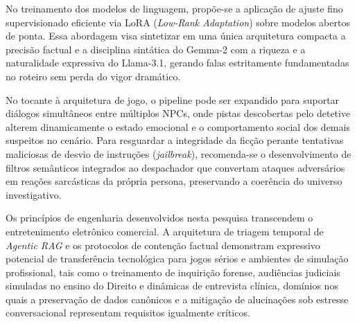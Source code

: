 No treinamento dos modelos de linguagem, propõe-se a aplicação de ajuste fino supervisionado eficiente via LoRA (\textit{Low-Rank Adaptation}) sobre modelos abertos de ponta. Essa abordagem visa sintetizar em uma única arquitetura compacta a precisão factual e a disciplina sintática do Gemma-2 com a riqueza e a naturalidade expressiva do Llama-3.1, gerando falas estritamente fundamentadas no roteiro sem perda do vigor dramático.

No tocante à arquitetura de jogo, o pipeline pode ser expandido para suportar diálogos simultâneos entre múltiplos NPCs, onde pistas descobertas pelo detetive alterem dinamicamente o estado emocional e o comportamento social dos demais suspeitos no cenário. Para resguardar a integridade da ficção perante tentativas maliciosas de desvio de instruções (\textit{jailbreak}), recomenda-se o desenvolvimento de filtros semânticos integrados ao despachador que convertam ataques adversários em reações sarcásticas da própria persona, preservando a coerência do universo investigativo.

Os princípios de engenharia desenvolvidos nesta pesquisa transcendem o entretenimento eletrônico comercial. A arquitetura de triagem temporal de \textit{Agentic RAG} e os protocolos de contenção factual demonstram expressivo potencial de transferência tecnológica para jogos sérios e ambientes de simulação profissional, tais como o treinamento de inquirição forense, audiências judiciais simuladas no ensino do Direito e dinâmicas de entrevista clínica, domínios nos quais a preservação de dados canônicos e a mitigação de alucinações sob estresse conversacional representam requisitos igualmente críticos.
